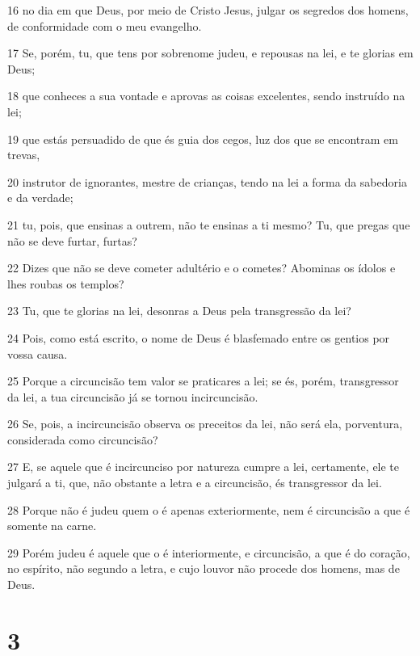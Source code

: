 \par 16 no dia em que Deus, por meio de Cristo Jesus, julgar os segredos dos homens, de conformidade com o meu evangelho.
\par 17 Se, porém, tu, que tens por sobrenome judeu, e repousas na lei, e te glorias em Deus;
\par 18 que conheces a sua vontade e aprovas as coisas excelentes, sendo instruído na lei;
\par 19 que estás persuadido de que és guia dos cegos, luz dos que se encontram em trevas,
\par 20 instrutor de ignorantes, mestre de crianças, tendo na lei a forma da sabedoria e da verdade;
\par 21 tu, pois, que ensinas a outrem, não te ensinas a ti mesmo? Tu, que pregas que não se deve furtar, furtas?
\par 22 Dizes que não se deve cometer adultério e o cometes? Abominas os ídolos e lhes roubas os templos?
\par 23 Tu, que te glorias na lei, desonras a Deus pela transgressão da lei?
\par 24 Pois, como está escrito, o nome de Deus é blasfemado entre os gentios por vossa causa.
\par 25 Porque a circuncisão tem valor se praticares a lei; se és, porém, transgressor da lei, a tua circuncisão já se tornou incircuncisão.
\par 26 Se, pois, a incircuncisão observa os preceitos da lei, não será ela, porventura, considerada como circuncisão?
\par 27 E, se aquele que é incircunciso por natureza cumpre a lei, certamente, ele te julgará a ti, que, não obstante a letra e a circuncisão, és transgressor da lei.
\par 28 Porque não é judeu quem o é apenas exteriormente, nem é circuncisão a que é somente na carne.
\par 29 Porém judeu é aquele que o é interiormente, e circuncisão, a que é do coração, no espírito, não segundo a letra, e cujo louvor não procede dos homens, mas de Deus.

\chapter{3}

